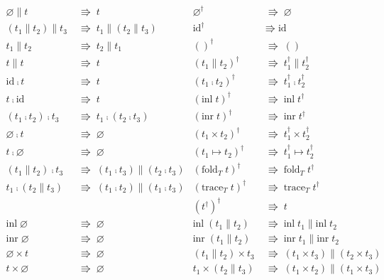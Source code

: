 \documentclass[a4j, dvipdfmx]{jsarticle}
\theoremstyle{definition}
\newcommand{\reduct}[2]{#1 &\;\Rrightarrow\; #2}
\begin{document}
\begin{figure}[H]
  \begin{align*}
    \reduct{\varnothing\parallel{}t}{t} &
    \reduct{\varnothing^\dagger}{\varnothing} \\
    \reduct{(t_1\parallel{}t_2)\parallel{}t_3}{t_1\parallel(t_2\parallel{}t_3)} &
    \reduct{\text{id}^\dagger}{\text{id}} \\
    \reduct{t_1\parallel{}t_2}{t_2\parallel{}t_1} &
    \reduct{()^\dagger}{()} \\
    \reduct{t\parallel{}t}{t} &
    \reduct{(t_1\parallel{}t_2)^\dagger}{t_1^\dagger\parallel{}t_2^\dagger} \\
    \reduct{\text{id}\fcmp{}t}{t} &
    \reduct{(t_1\fcmp{}t_2)^\dagger}{t_1^\dagger\fcmp{}t_2^\dagger} \\
    \reduct{t\fcmp\text{id}}{t} &
    \reduct{(\text{inl}\;t)^\dagger}{\text{inl}\;t^\dagger} \\
    \reduct{(t_1\fcmp{}t_2)\fcmp{}t_3}{t_1\fcmp(t_2\fcmp{}t_3)} &
    \reduct{(\text{inr}\;t)^\dagger}{\text{inr}\;t^\dagger} \\
    \reduct{\varnothing\fcmp{}t}{\varnothing} &
    \reduct{(t_1\times{}t_2)^\dagger}{t_1^\dagger\times{}t_2^\dagger} \\
    \reduct{t\fcmp\varnothing}{\varnothing} &
    \reduct{(t_1\mapsto{}t_2)^\dagger}{t_1^\dagger\mapsto{}t_2^\dagger} \\
    \reduct{(t_1\parallel{}t_2)\fcmp{}t_3}{(t_1\fcmp{}t_3)\parallel(t_2\fcmp{}t_3)} &
    \reduct{(\text{fold}_T\;t)^\dagger}{\text{fold}_T\;t^\dagger} \\
    \reduct{t_1\fcmp(t_2\parallel{}t_3)}{(t_1\fcmp{}t_2)\parallel(t_1\fcmp{}t_3)} &
    \reduct{(\text{trace}_T\;t)^\dagger}{\text{trace}_T\;t^\dagger} \\
    && \reduct{(t^\dagger)^\dagger}{t} \\
    \reduct{\text{inl}\;\varnothing}{\varnothing} &
    \reduct{\text{inl}\;(t_1\parallel{}t_2)}{\text{inl}\;t_1\parallel\text{inl}\;t_2} \\
    \reduct{\text{inr}\;\varnothing}{\varnothing} &
    \reduct{\text{inr}\;(t_1\parallel{}t_2)}{\text{inr}\;t_1\parallel\text{inr}\;t_2} \\
    \reduct{\varnothing\times{}t}{\varnothing} &
    \reduct{(t_1\parallel{}t_2)\times{}t_3}{(t_1\times{}t_3)\parallel(t_2\times{}t_3)} \\
    \reduct{t\times\varnothing}{\varnothing} &
    \reduct{t_1\times(t_2\parallel{}t_3)}{(t_1\times{}t_2)\parallel(t_1\times{}t_3)} \\

\end{align*}
\end{figure}
\end{document}
